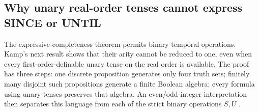 
\subsection{Why unary real-order tenses cannot express SINCE or UNTIL}
\label{sec:p09-kamp-iv1-unary-separation}

The expressive-completeness theorem permits binary temporal operations.
Kamp's next result shows that their arity cannot be reduced to one, even
when every first-order-definable unary tense on the real order is available.
The proof has three steps: one discrete proposition generates only four
truth sets; finitely many disjoint such propositions generate a finite
Boolean algebra; every formula using unary tenses preserves that algebra.
An even/odd-integer interpretation then separates this language from each
of the strict binary operations \(S,U\)
\cite[ch.~IV, thm.~1 and lemmas~1--3, pp.~95--99]{Kamp1968}.

